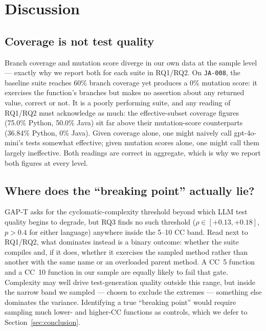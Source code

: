 \section{Discussion}\label{sec:discussion}

\subsection{Coverage is not test quality}
Branch coverage and mutation score diverge in our own data at the sample level --- exactly
why we report both for each suite in RQ1/RQ2. On \texttt{JA-008}, the baseline suite
reaches 60\% branch coverage yet produces a 0\% mutation score: it exercises the
function's branches but makes no assertion about any returned value, correct or not. It is
a poorly performing suite, and any reading of RQ1/RQ2 must acknowledge as much: the
effective-subset coverage figures (75.0\% Python, 50.0\% Java) sit far above their
mutation-score counterparts (36.84\% Python, 0\% Java). Given coverage alone, one might
naively call gpt-4o-mini's tests somewhat effective; given mutation scores alone, one
might call them largely ineffective. Both readings are correct in aggregate, which is why
we report both figures at every level.

\subsection{Where does the ``breaking point'' actually lie?}
GAP-T asks for the cyclomatic-complexity threshold beyond which LLM test quality begins to
degrade, but RQ3 finds no such threshold ($\rho \in [+0.13, +0.18]$, $p>0.4$ for either
language) anywhere inside the 5--10 CC band. Read next to RQ1/RQ2, what dominates instead
is a binary outcome: whether the suite compiles and, if it does, whether it exercises the
sampled method rather than another with the same name or an overloaded parent method. A
CC~5 function and a CC~10 function in our sample are equally likely to fail that gate.
Complexity may well drive test-generation quality outside this range, but inside the
narrow band we sampled --- chosen to exclude the extremes --- something else dominates the
variance. Identifying a true ``breaking point'' would require sampling much lower- and
higher-CC functions as controls, which we defer to Section~\ref{sec:conclusion}.

